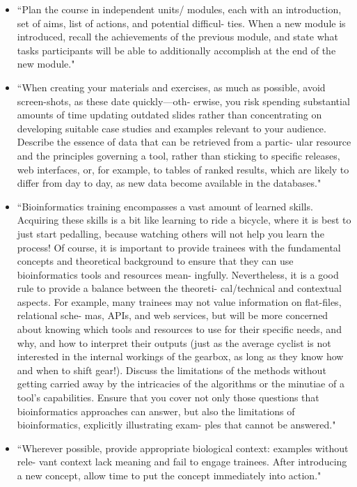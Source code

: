 \documentclass[pdftex,english,11pt,parskip=half]{scrartcl}
\begin{document}
\begin{itemize}
\item ``Plan the course in independent units/ modules, each with an introduction, set of aims, list of actions, and potential difficul- ties. When a new module is introduced, recall the achievements of the previous module, and state what tasks participants will be able to additionally accomplish at the end of the new module."  \cite{via2011ten}
\item ``When creating your materials and exercises, as much as possible, avoid screen-shots, as these date quickly—oth- erwise, you risk spending substantial amounts of time updating outdated slides rather than concentrating on developing suitable case studies and examples relevant to your audience. Describe the essence of data that can be retrieved from a partic- ular resource and the principles governing a tool, rather than sticking to specific releases, web interfaces, or, for example, to tables of ranked results, which are likely to differ from day to day, as new data become available in the databases." \cite{via2011ten}
\item ``Bioinformatics training encompasses a vast amount of learned skills. Acquiring these skills is a bit like learning to ride a bicycle, where it is best to just start pedalling, because watching others will not help you learn the process! Of course, it is important to provide trainees with the fundamental concepts and theoretical background to ensure that they can use bioinformatics tools and resources mean- ingfully. Nevertheless, it is a good rule to provide a balance between the theoreti- cal/technical and contextual aspects. For example, many trainees may not value information on flat-files, relational sche- mas, APIs, and web services, but will be more concerned about knowing which tools and resources to use for their specific needs, and why, and how to interpret their outputs (just as the average cyclist is not interested in the internal workings of the gearbox, as long as they know how and when to shift gear!). Discuss the limitations of the methods without getting carried away by the intricacies of the algorithms or the minutiae of a tool’s capabilities. Ensure that you cover not only those questions that bioinformatics approaches can answer, but also the limitations of bioinformatics, explicitly illustrating exam- ples that cannot be answered." \cite{via2011ten}
\item ``Wherever possible, provide appropriate biological context: examples without rele- vant context lack meaning and fail to engage trainees. After introducing a new concept, allow time to put the concept immediately into action." \cite{via2011ten}

\end{itemize}
\end{document}
